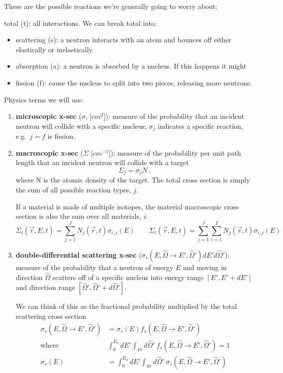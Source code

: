 \documentclass[12pt]{article}
\newcommand{\vOmega}{\ensuremath{\hat{\Omega}}}
\begin{document}
These are the possible reactions we're generally going to worry about:

\hspace*{1em}total (t): all interactions. We can break total into:
\begin{itemize}
\item scattering (s): a neutron interacts with an atom and bounces off either elastically or inelastically.
\item absorption (a): a neutron is absorbed by a nucleus. If this happens it might
\item fission (f): cause the nucleus to split into two pieces, releasing more neutrons.
\end{itemize}

Physics terms we will use:
\begin{enumerate}
\item \textbf{microscopic x-sec} ($\sigma$, [$cm^2$]): measure of the probability that an incident neutron will collide with a specific nucleus; $\sigma_j$ indicates a specific reaction, e.g.\ $j=f$ is fission.

\item \textbf{macroscopic x-sec} ($\Sigma$ [$cm^{-1}$]): measure of the probability per unit path length that an incident neutron will collide with a target
\[\Sigma_j = \sigma_j N\:,\]
where N is the atomic density of the target. The total cross section is simply the sum of all possible reaction types, $j$. 

If a material is made of multiple isotopes, the material macroscopic cross section is also the sum over all materials, $i$:
\[
\Sigma_i(\vec{r}, E, t) = \sum_{j=1}^J  N_j(\vec{r}, t)\sigma_{i,j}(E)
\qquad
\Sigma_t(\vec{r}, E, t) = \sum_{j=1}^J \sum_{i=1}^I N_j(\vec{r}, t)\sigma_{i,j}(E)
\]

\item \textbf{double-differential scattering x-sec} ($\sigma_s(E, \vOmega \rightarrow E', \vOmega')dE' d\vOmega'$): measure of the probability that a neutron of energy $E$ and moving in direction $\vOmega$ scatters off of a specific nucleus into energy range $[E', E' + dE']$ and direction range $[\vOmega', \vOmega' + d\vOmega']$.

We can think of this as the fractional probability multiplied by the total scattering cross section
\begin{align*}
\sigma_s(E, \vOmega \rightarrow E', \vOmega') &= \sigma_s(E) f_s(E, \vOmega \rightarrow E', \vOmega')\\
\text{where } &\int_0^{E_0} dE' \int_{4 \pi} d\vOmega' \: f_s(E, \vOmega \rightarrow E', \vOmega') = 1\\
\sigma_s(E) &= \int_0^{E_0} dE' \int_{4 \pi} d\vOmega' \:\sigma_s(E, \vOmega \rightarrow E', \vOmega')
\end{align*}


\end{enumerate}
\end{document}
